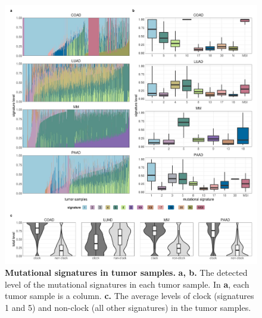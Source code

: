 \documentclass[english, 10pt, letterpaper]{article}
\newcommand{\beginsupplement}{%
        \setcounter{table}{0}
        \renewcommand{\thetable}{\arabic{table}}%
        \setcounter{figure}{0}
        \renewcommand{\thefigure}{\arabic{figure}}%
    }
\begin{document}

\beginsupplement
\makeatletter
\renewcommand{\fnum@figure}{Supplementary \figurename~\thefigure}
\makeatother



\begin{figure}[h!]
\centering
\includegraphics[width=180mm]{figures/Supp_Fig_1.jpeg}
\caption{
    \textbf{Mutational signatures in tumor samples.}
    \textbf{a, b.} The detected level of the mutational signatures in each tumor sample. In \textbf{a}, each tumor sample is a column.
    \textbf{c.} The average levels of clock (signatures 1 and 5) and non-clock (all other signatures) in the tumor samples.
}
\label{sfig:mutational-signatures-supp}
\end{figure}
\newpage
\end{document}
